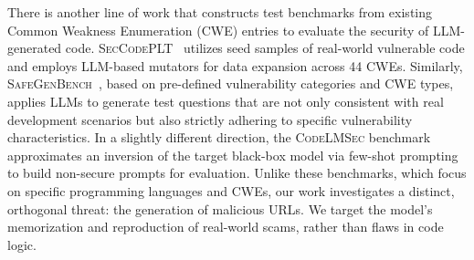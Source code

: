 There is another line of work that constructs test benchmarks 
from existing Common Weakness Enumeration (CWE) entries to 
evaluate the security of LLM-generated code. 
\textsc{SecCodePLT}~\citep{yang2024seccodeplt} utilizes seed 
samples of real-world vulnerable code and employs LLM-based mutators 
for data expansion across 44 CWEs. 
Similarly, \textsc{SafeGenBench}~\citep{li2025safegenbench}, 
based on pre-defined vulnerability categories and CWE types, 
applies LLMs to generate test questions that are not only consistent 
with real development scenarios but also strictly adhering 
to specific vulnerability characteristics. 
In a slightly different direction, the \textsc{CodeLMSec} 
benchmark~\citep{debenedetti2023a} approximates an inversion 
of the target black-box model via few-shot prompting to 
build non-secure prompts for evaluation. 
Unlike these benchmarks, which focus on specific programming 
languages and CWEs, our work investigates a distinct, orthogonal threat: 
the generation of malicious URLs. We target the model's 
memorization and reproduction of real-world scams, rather than 
flaws in code logic. 





